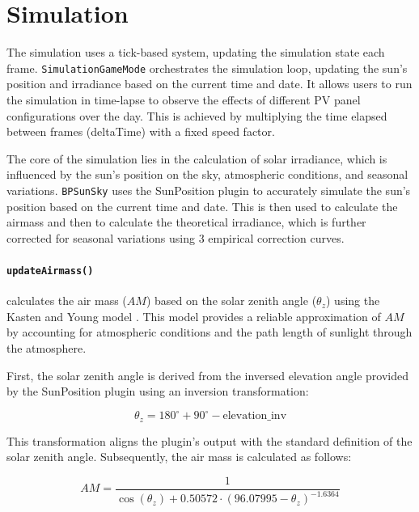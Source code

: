 \documentclass[draft, final]{vutinfth} %
\begin{document}
\section{Simulation}


The simulation uses a tick-based system, updating the simulation state each frame. \lstinline|SimulationGameMode| orchestrates the simulation loop, updating the sun's position and irradiance based on the current time and date. It allows users to run the simulation in time-lapse to observe the effects of different PV panel configurations over the day. This is achieved by multiplying the time elapsed between frames (deltaTime) with a fixed speed factor.

The core of the simulation lies in the calculation of solar irradiance, which is influenced by the sun's position on the sky, atmospheric conditions, and seasonal variations. \lstinline|BPSunSky| uses the SunPosition plugin to accurately simulate the sun's position based on the current time and date. This is then used to calculate the airmass and then to calculate the theoretical irradiance, which is further corrected for seasonal variations using 3 empirical correction curves.

\paragraph{\lstinline|updateAirmass()|} calculates the air mass ($AM$) based on the solar zenith angle ($\theta_z$) using the Kasten and Young model \cite{Kasten1989airmass}. This model provides a reliable approximation of $AM$ by accounting for atmospheric conditions and the path length of sunlight through the atmosphere.

First, the solar zenith angle is derived from the inversed elevation angle provided by the SunPosition plugin using an inversion transformation:

\begin{equation} \label{eq:theta_z}
\theta_z = 180^\circ + 90^\circ - \text{elevation\_inv}
\end{equation}

This transformation aligns the plugin's output with the standard definition of the solar zenith angle. Subsequently, the air mass is calculated as follows:

\begin{equation} \label{eq:airmass}
AM = \frac{1}{\cos(\theta_z) + 0.50572 \cdot (96.07995 - \theta_z)^{-1.6364}}
\end{equation}
\end{document}
